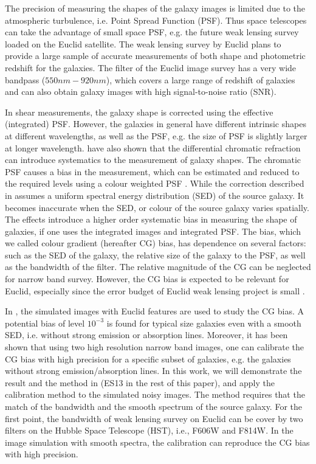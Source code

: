 \documentclass[useAMS,usenatbib]{mn2e}
\begin{document}
The precision of measuring the shapes of the galaxy images is limited
due to the atmospheric turbulence, i.e. Point Spread Function
(PSF). Thus space telescopes can take the advantage of small space
PSF, e.g. the future weak lensing survey loaded on the Euclid
satellite. The weak lensing survey by Euclid plans to provide a large
sample of accurate measurements of both shape and photometric redshift
for the galaxies. The filter of the Euclid image survey has a very wide
bandpass ($550nm-920nm$), which covers a large range of redshift of
galaxies and can also obtain galaxy images with high signal-to-noise
ratio (SNR).

In shear measurements, the galaxy shape is corrected using the
effective (integrated) PSF. However, the galaxies in general have
different intrinsic shapes at different wavelengths, as well as the
PSF, e.g. the size of PSF is slightly larger at longer wavelength.
\citep{2015ApJ...807..182M} have also shown that the differential
chromatic refraction can introduce systematics to the measurement of
galaxy shapes.  The chromatic PSF causes a bias in the measurement,
which can be estimated and reduced to the required levels using a
colour weighted PSF \citep{2010MNRAS.405..494C}. While the correction
described in \citet{2010MNRAS.405..494C} assumes a uniform spectral
energy distribution (SED) of the source galaxy. It becomes inaccurate
when the SED, or colour of the source galaxy varies spatially.  The
effects introduce a higher order systematic bias in measuring the
shape of galaxies, if one uses the integrated images and integrated
PSF. The bias, which we called colour gradient (hereafter CG) bias,
has dependence on several factors: such as the SED of the galaxy, the
relative size of the galaxy to the PSF, as well as the bandwidth of
the filter. The relative magnitude of the CG can be neglected for
narrow band survey. However, the CG bias is expected to be relevant
for Euclid, especially since the error budget of Euclid weak lensing project
is small \citep[e.g.][]{2013MNRAS.431.3103C,2013MNRAS.429..661M}.

In \citep{2012MNRAS.421.1385V, 2013MNRAS.432.2385S}, the simulated
images with Euclid features are used to study the CG bias. A potential
bias of level $10^{-3}$ is found for typical size galaxies even with a
smooth SED, i.e. without strong emission or absorption lines.
Moreover, it has been shown that using two high resolution narrow
band images, one can calibrate the CG bias with high precision for a
specific subset of galaxies, e.g. the galaxies without strong
emission/absorption lines. In this work, we will demonstrate the
result and the method in \citet{2013MNRAS.432.2385S}(ES13 in the rest of this paper), and apply the
calibration method to the simulated noisy images. The method requires
that the match of the bandwidth and the smooth spectrum of the source
galaxy. For the first point, the bandwidth of weak lensing survey on
Euclid can be cover by two filters on the Hubble Space Telescope
(HST), i.e., F606W and F814W. In the image simulation with smooth
spectra, the calibration can reproduce the CG bias with high
precision.
\end{document}
